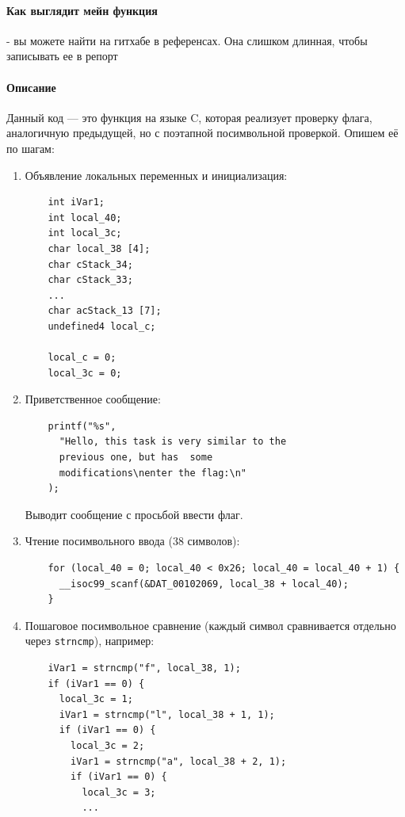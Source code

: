 \paragraph{Как выглядит мейн функция} - вы можете найти на гитхабе в референсах.
Она слишком длинная, чтобы записывать ее в репорт

\paragraph{Описание}

Данный код --- это функция на языке C, которая реализует проверку флага, аналогичную предыдущей, но с поэтапной посимвольной проверкой.
Опишем её по шагам:

\begin{enumerate}
    \item Объявление локальных переменных и инициализация:
    \begin{verbatim}
    int iVar1;
    int local_40;
    int local_3c;
    char local_38 [4];
    char cStack_34;
    char cStack_33;
    ...
    char acStack_13 [7];
    undefined4 local_c;

    local_c = 0;
    local_3c = 0;
    \end{verbatim}

    \item Приветственное сообщение:
    \begin{verbatim}
    printf("%s",
      "Hello, this task is very similar to the
      previous one, but has  some
      modifications\nenter the flag:\n"
    );
    \end{verbatim}
    Выводит сообщение с просьбой ввести флаг.

    \item Чтение посимвольного ввода (38 символов):
    \begin{verbatim}
    for (local_40 = 0; local_40 < 0x26; local_40 = local_40 + 1) {
      __isoc99_scanf(&DAT_00102069, local_38 + local_40);
    }
    \end{verbatim}

    \item Пошаговое посимвольное сравнение (каждый символ сравнивается отдельно через \texttt{strncmp}), например:
    \begin{verbatim}
    iVar1 = strncmp("f", local_38, 1);
    if (iVar1 == 0) {
      local_3c = 1;
      iVar1 = strncmp("l", local_38 + 1, 1);
      if (iVar1 == 0) {
        local_3c = 2;
        iVar1 = strncmp("a", local_38 + 2, 1);
        if (iVar1 == 0) {
          local_3c = 3;
          ...
    \end{verbatim}


\end{enumerate}
